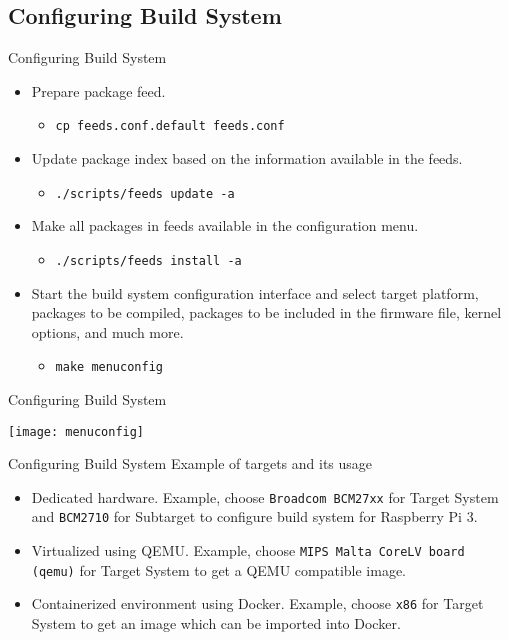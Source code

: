 \subsection{Configuring Build System}
\begin{frame}{Configuring Build System}
    \begin{itemize}[<+(1)->]
        \item Prepare package feed.
        \begin{itemize}
            \item \texttt{cp feeds.conf.default feeds.conf}
        \end{itemize}
        \item Update package index based on the information available in the feeds.
        \begin{itemize}
            \item \texttt{./scripts/feeds update -a}
        \end{itemize}
        \item Make all packages in feeds available in the configuration menu.
        \begin{itemize}
            \item \texttt{./scripts/feeds install -a}
        \end{itemize}
        \item Start the build system configuration interface and select target platform, packages to be compiled, packages to be included in the firmware file, kernel options, and much more.
        \begin{itemize}
            \item \texttt{make menuconfig}
        \end{itemize}
    \end{itemize}
\end{frame}

\begin{frame}{Configuring Build System}
    \centerline{\texttt{[image: menuconfig]}}
\end{frame}

\begin{frame}{Configuring Build System}
    Example of targets and its usage
    \begin{itemize}[<+(1)->]
        \item Dedicated hardware. Example, choose \texttt{Broadcom BCM27xx} for Target System and \texttt{BCM2710} for Subtarget to configure build system for Raspberry Pi 3.
        \item Virtualized using QEMU. Example, choose \texttt{MIPS Malta CoreLV board (qemu)} for Target System to get a QEMU compatible image.
        \item Containerized environment using Docker. Example, choose \texttt{x86} for Target System to get an image which can be imported into Docker.
    \end{itemize}
\end{frame}

